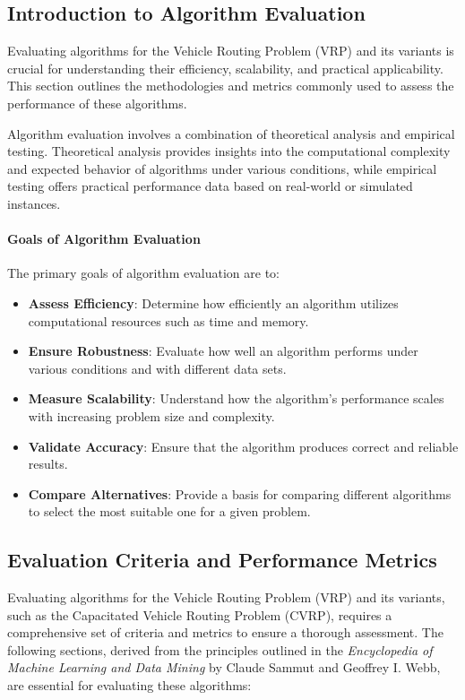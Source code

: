 \documentclass[
]{article}
\begin{document}
\subsection{Introduction to Algorithm Evaluation}

  Evaluating algorithms for the Vehicle Routing Problem (VRP) and its variants is crucial for understanding their efficiency, scalability, and practical applicability. This section outlines the methodologies and metrics commonly used to assess the performance of these algorithms.
  
  Algorithm evaluation involves a combination of theoretical analysis and empirical testing. Theoretical analysis provides insights into the computational complexity and expected behavior of algorithms under various conditions, while empirical testing offers practical performance data based on real-world or simulated instances.
  
  \paragraph{Goals of Algorithm Evaluation}
  The primary goals of algorithm evaluation are to:
  \begin{itemize}
      \item \textbf{Assess Efficiency}: Determine how efficiently an algorithm utilizes computational resources such as time and memory.
      \item \textbf{Ensure Robustness}: Evaluate how well an algorithm performs under various conditions and with different data sets.
      \item \textbf{Measure Scalability}: Understand how the algorithm's performance scales with increasing problem size and complexity.
      \item \textbf{Validate Accuracy}: Ensure that the algorithm produces correct and reliable results.
      \item \textbf{Compare Alternatives}: Provide a basis for comparing different algorithms to select the most suitable one for a given problem.
  \end{itemize}
  
  \subsection{Evaluation Criteria and Performance Metrics}

  Evaluating algorithms for the Vehicle Routing Problem (VRP) and its variants, such as the Capacitated Vehicle Routing Problem (CVRP), requires a comprehensive set of criteria and metrics to ensure a thorough assessment. The following sections, derived from the principles outlined in the \textit{Encyclopedia of Machine Learning and Data Mining} by Claude Sammut and Geoffrey I. Webb, are essential for evaluating these algorithms:
  
\end{document}
